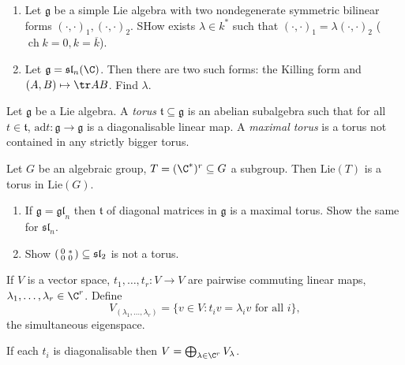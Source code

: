 \documentclass[a4paper]{article}
\newcommand*{\Lie}[1]{\mathfrak{#1}} %
\newcommand{\ad}{\mathrm{ad}} %
\DeclareMathOperator{\cha}{ch} %
\begin{document}
\begin{ex}\leavevmode
  \begin{enumerate}
  \item Let \(\Lie g\) be a simple Lie algebra with two nondegenerate symmetric bilinear forms \((\cdot, \cdot)_1, (\cdot, \cdot)_2\). SHow exists \(\lambda \in k^*\) such that \((\cdot, \cdot)_1 = \lambda (\cdot, \cdot)_2\) (\(\cha k = 0, k = \overline k\)).
  \item Let \(\Lie g = \Lie{sl}_n(\C)\). Then there are two such forms: the Killing form and \((A, B) \mapsto \tr AB\). Find \(\lambda\).
  \end{enumerate}
\end{ex}

\begin{definition}[torus]
  Let \(\Lie g\) be a Lie algebra. A \emph{torus} \(\Lie t \subseteq \Lie g\) is an abelian subalgebra such that for all \(t \in \Lie t\), \(\ad t: \Lie g \to \Lie g\) is a diagonalisable linear map. A \emph{maximal torus} is a torus not contained in any strictly bigger torus.
\end{definition}

\begin{eg}
  Let \(G\) be an algebraic group, \(T = (\C^*)^r \subseteq G\) a subgroup. Then \(\mathrm{Lie}(T)\) is a torus in \(\mathrm{Lie}(G)\).
\end{eg}

\begin{ex}\leavevmode
  \begin{enumerate}
  \item If \(\Lie g = \Lie{gl}_n\) then \(\Lie t\) of diagonal matrices in \(\Lie g\) is a maximal torus. Show the same for \(\Lie{sl}_n\).
  \item Show \(
    \begin{psmallmatrix}
      0 & * \\
      0 & 0
    \end{psmallmatrix}
    \subseteq \Lie{sl}_2\) is not a torus.
  \end{enumerate}
\end{ex}

If \(V\) is a vector space, \(t_1, \dots, t_r: V \to V\) are pairwise commuting linear maps, \(\lambda_1, \dots, \lambda_r \in \C^r\). Define
\[
  V_{(\lambda_1, \dots, \lambda_r)} = \{v \in V: t_i v = \lambda_i v \text{ for all } i\},
\]
the simultaneous eigenspace.

\begin{lemma}
  If each \(t_i\) is diagonalisable then \(V = \bigoplus_{\lambda \in \C^r} V_\lambda\).
\end{lemma}
\end{document}
